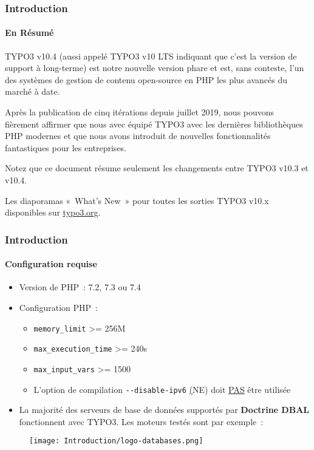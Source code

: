 \begin{frame}[fragile]
	\frametitle{Introduction}
	\framesubtitle{En Résumé}

	\small
		TYPO3 v10.4 (aussi appelé TYPO3 v10 LTS indiquant que c'est la version de support à long-terme)
		est notre nouvelle version phare et est, sans conteste, l'un des systèmes de gestion
		de contenu open-source en PHP les plus avancés du marché à date.

		\vspace{0.2cm}

		Après la publication de cinq itérations depuis juillet 2019, nous pouvons fièrement
		affirmer que nous avec équipé TYPO3 avec les dernières bibliothèques PHP modernes et
		que nous avons introduit de nouvelles fonctionnalités fantastiques pour les entreprises.

		\vspace{0.2cm}

		Notez que ce document résume seulement les changements entre TYPO3 v10.3 et v10.4.

		\vspace{0.2cm}

		Les diaporamas «~What's New~» pour toutes les sorties TYPO3 v10.x disponibles sur
		\href{https://typo3.org/help/documentation/whats-new/}{typo3.org}.

	\normalsize

\end{frame}


\begin{frame}[fragile]
	\frametitle{Introduction}
	\framesubtitle{Configuration requise}

	\begin{itemize}
		\item Version de PHP~: 7.2, 7.3 ou 7.4
		\item Configuration PHP~:

			\begin{itemize}
				\item \texttt{memory\_limit} >= 256M
				\item \texttt{max\_execution\_time} >= 240s
				\item \texttt{max\_input\_vars} >= 1500
				\item L'option de compilation \texttt{-}\texttt{-disable-ipv6}
					\underline(NE) doit \underline{PAS} être utilisée
			\end{itemize}

		\item La majorité des serveurs de base de données supportés par \textbf{Doctrine DBAL}
			fonctionnent avec TYPO3. Les moteurs testés sont par exemple~:
	\end{itemize}

	\begin{figure}
		\texttt{[image: Introduction/logo-databases.png]}
	\end{figure}

\end{frame}

